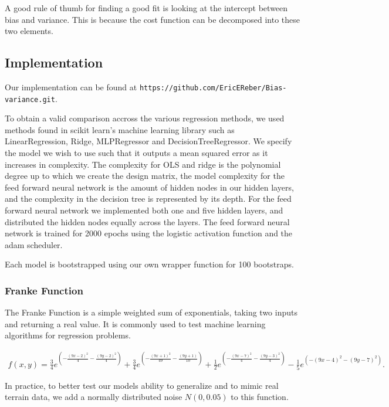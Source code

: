 \documentclass[onecolumn,10pt,cleanfoot]{asme2ej}
\begin{document}
A good rule of thumb for finding a good fit is looking at the intercept between bias and variance. This is because the cost function can be decomposed into these two elements.

\subsection{Implementation}

Our implementation can be found at \texttt{https://github.com/EricEReber/Bias-variance.git}.

To obtain a valid comparison accross the various regression methods, we used methods found in scikit learn's machine learning library such as  LinearRegression, Ridge, MLPRegressor and DecisionTreeRegressor. We specify the model we wish to use such that it outputs a mean squared error as it increases in complexity. The complexity for OLS and ridge is the polynomial degree up to which we create the design matrix, the model complexity for the feed forward neural network is the amount of hidden nodes in our hidden layers, and the complexity in the decision tree is represented by its depth. For the feed forward neural network we implemented both one and five hidden layers, and distributed the hidden nodes equally across the layers. The feed forward neural network is trained for 2000 epochs using the logistic activation function and the adam scheduler.

Each model is bootstrapped using our own wrapper function for 100 bootstraps.

\subsubsection{Franke Function}

The Franke Function is a simple weighted sum of exponentials, taking two inputs and returning a real value. It is commonly used to test machine learning algorithms for regression problems.


\begin{multline}
f(x,y) = \frac{3}{4}e^{\left(-\frac{(9x-2)^2}{4}-\frac{(9y-2)^2}{4}\right)} +  \frac{3}{4}e^{\left(-\frac{(9x+1)^2}{49}-\frac{(9y+1)}{10}\right)} +
\frac{1}{2}e^{\left(-\frac{(9x-7)^2}{4}-\frac{(9y-3)^2}{4}\right)} - 
\frac{1}{5}e^{\left(-(9x-4)^2-(9y-7)^2\right)}.
\end{multline}

In practice, to better test our models ability to generalize and to mimic real terrain data, we add a normally distributed noise $N(0,0.05)$ to this function.
\end{document}
